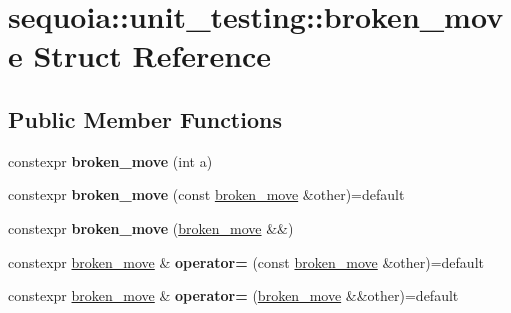 \hypertarget{structsequoia_1_1unit__testing_1_1broken__move}{}\section{sequoia\+::unit\+\_\+testing\+::broken\+\_\+move Struct Reference}
\label{structsequoia_1_1unit__testing_1_1broken__move}
\subsection*{Public Member Functions}
\begin{DoxyCompactItemize}
\item 
\mbox{\label{structsequoia_1_1unit__testing_1_1broken__move_ad385151255bfca9f6fabb198fb12e90e}} 
constexpr {\bfseries broken\+\_\+move} (int a)
\item 
\mbox{\label{structsequoia_1_1unit__testing_1_1broken__move_a3cb6d1665290bb86a8f7aef488c21e4f}} 
constexpr {\bfseries broken\+\_\+move} (const \mbox{\hyperlink{structsequoia_1_1unit__testing_1_1broken__move}{broken\+\_\+move}} \&other)=default
\item 
\mbox{\label{structsequoia_1_1unit__testing_1_1broken__move_abcdaeefe78165eb0d89501269dd35b2c}} 
constexpr {\bfseries broken\+\_\+move} (\mbox{\hyperlink{structsequoia_1_1unit__testing_1_1broken__move}{broken\+\_\+move}} \&\&)
\item 
\mbox{\label{structsequoia_1_1unit__testing_1_1broken__move_a0a7a84197785010e1e3c97bc98d82bc3}} 
constexpr \mbox{\hyperlink{structsequoia_1_1unit__testing_1_1broken__move}{broken\+\_\+move}} \& {\bfseries operator=} (const \mbox{\hyperlink{structsequoia_1_1unit__testing_1_1broken__move}{broken\+\_\+move}} \&other)=default
\item 
\mbox{\label{structsequoia_1_1unit__testing_1_1broken__move_a9e6b3ad3610a8de9b14f34ed048029b7}} 
constexpr \mbox{\hyperlink{structsequoia_1_1unit__testing_1_1broken__move}{broken\+\_\+move}} \& {\bfseries operator=} (\mbox{\hyperlink{structsequoia_1_1unit__testing_1_1broken__move}{broken\+\_\+move}} \&\&other)=default
\end{DoxyCompactItemize}
